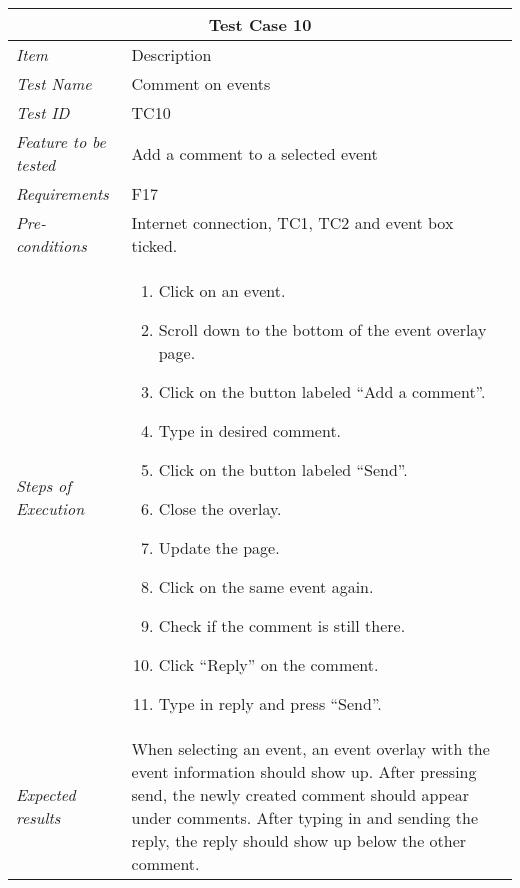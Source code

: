 %
\begin{minipage}{\linewidth}
\setlength{\tabcolsep}{15pt}
\centering
{}
\begin{tabular}{ |l|p{70mm}| }
	\hline
	\multicolumn{2}{|c|}{\cellcolor{gray!25} \textbf{Test Case 10}} \\
	\hline
	\it{\cellcolor{gray!25}Item} & {\cellcolor{gray!25} Description } \\
	\hline
	\it{\cellcolor{gray!25}Test Name } & Comment on events \\ \hline
	\it{\cellcolor{gray!25}Test ID} & TC10 \\ \hline
	\it{\cellcolor{gray!25}Feature to be tested} & Add a comment to a selected event \\ \hline
	\it{\cellcolor{gray!25}Requirements} & F17  \\ \hline
	\it{\cellcolor{gray!25}Pre-conditions} & Internet connection, TC1, TC2 and event box ticked.  \\ \hline
	\it{\cellcolor{gray!25}Steps of Execution} & \begin{enumerate}
	                                       \item Click on an event.
	                                       \item Scroll down to the bottom of the event overlay page.
	                                       \item Click on the button labeled “Add a comment”.
	                                       \item Type in desired comment.
	                                       \item Click on the button labeled “Send”.
	                                       \item Close the overlay.
	                                       \item Update the page.
	                                       \item Click on the same event again.
	                                       \item Check if the comment is still there.
	                                       \item Click “Reply” on the comment.
	                                       \item Type in reply and press “Send”.
	                                     \end{enumerate} \\ \hline
	\it{\cellcolor{gray!25}Expected results} & When selecting an event, an event overlay with the event information should show up. After pressing send, the newly created comment should appear under comments. After typing in and sending the reply, the reply should show up below the other comment. \\
	\hline
\end{tabular}
\medskip
\end{minipage}
